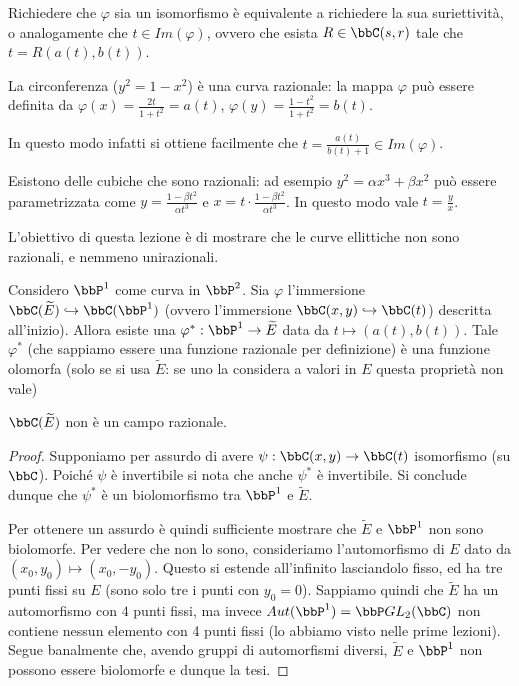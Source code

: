 Richiedere che $\varphi$ sia un isomorfismo è equivalente a richiedere la sua suriettività, o analogamente che $t\in Im(\varphi)$, ovvero che esista $R\in \bbC(s,r)$ tale che $t=R(a(t),b(t))$.
\begin{osservazione}
La circonferenza ($y^2=1-x^2$) è una curva razionale: la mappa $\varphi$ può essere definita da $\varphi(x)=\frac{2t}{1+t^2}=a(t)$, $\varphi(y)=\frac{1-t^2}{1+t^2}=b(t)$.

In questo modo infatti si ottiene facilmente che $t=\frac{a(t)}{b(t)+1}\in Im(\varphi)$.
\end{osservazione}
\begin{osservazione}
Esistono delle cubiche che sono razionali: ad esempio $y^2=\alpha x^3 + \beta x^2$ può essere parametrizzata come $y=\frac{1-\beta t^2}{\alpha t^3}$ e $x=t\cdot\frac{1-\beta t^2}{\alpha t^3}$.
In questo modo vale $t=\frac{y}{x}$.
\end{osservazione}

L'obiettivo di questa lezione è di mostrare che le curve ellittiche non sono razionali, e nemmeno unirazionali.

\begin{fatto}
Considero $\bbP^1$ come curva in $\bbP^2$. Sia $\varphi$ l'immersione $\bbC(\widetilde{E})\hookrightarrow\bbC(\bbP^1)$ (ovvero l'immersione $\bbC(x,y)\hookrightarrow\bbC(t)$) descritta all'inizio).
Allora esiste una $\varphi^*:\bbP^1\rightarrow\widetilde{E}$ data da $t\mapsto (a(t),b(t))$.
Tale $\varphi^*$ (che sappiamo essere una funzione razionale per definizione) è una funzione olomorfa (solo se si usa $\widetilde{E}$: se uno la considera a valori in $E$ questa proprietà non vale)
\end{fatto}

\begin{teorema}
$\bbC(\widetilde{E})$ non è un campo razionale.
\end{teorema}

\begin{proof}
Supponiamo per assurdo di avere $\psi:\bbC(x,y)\rightarrow\bbC(t)$ isomorfismo (su $\bbC$). Poiché $\psi$ è invertibile si nota che anche $\psi^*$ è invertibile. Si conclude dunque che $\psi^*$ è un biolomorfismo tra $\bbP^1$ e $\widetilde{E}$.

Per ottenere un assurdo è quindi sufficiente mostrare che $\widetilde{E}$ e $\bbP^1$ non sono biolomorfe. Per vedere che non lo sono, consideriamo l'automorfismo di $E$ dato da $(x_0,y_0)\mapsto(x_0,-y_0)$. Questo si estende all'infinito lasciandolo fisso, ed ha tre punti fissi su $E$ (sono solo tre i punti con $y_0=0$). Sappiamo quindi che $\widetilde{E}$ ha un automorfismo con $4$ punti fissi, ma invece $Aut(\bbP^1)=\bbP GL_2(\bbC)$ non contiene nessun elemento con 4 punti fissi (lo abbiamo visto nelle prime lezioni). Segue banalmente che, avendo gruppi di automorfismi diversi, $\widetilde{E}$ e $\bbP^1$ non possono essere biolomorfe e dunque la tesi.
\end{proof}

